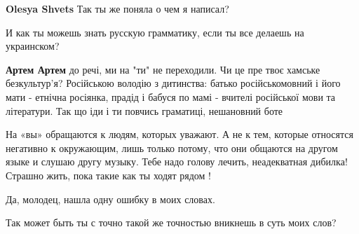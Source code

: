 \begin{itemize}
\begin{itemize}
\begin{itemize}
 
\textbf{Olesya Shvets} Так ты же поняла о чем я написал?

 
И как ты можешь знать русскую грамматику, если ты все делаешь на украинском?

 
\textbf{Артем Артем} до речі, ми на "ти" не переходили. Чи це пре твоє хамське
безкультур'я? Російською володію з дитинства: батько російськомовний і його
мати - етнічна росіянка, прадід і бабуся по мамі - вчителі російської мови та
літератури. Так що іди і ти повчись граматиці, нешановний боте
\end{itemize}

 

На «вы» обращаются к людям, которых уважают. А не к тем, которые относятся
негативно к окружающим, лишь только потому, что они общаются на другом языке и
слушаю другу музыку. Тебе надо голову лечить, неадекватная дибилка! Страшно
жить, пока такие как ты ходят рядом !


 

Да, молодец, нашла одну ошибку в моих словах.

Так может быть ты с точно такой же точностью вникнешь в суть моих слов?


\end{itemize}
\end{itemize}
